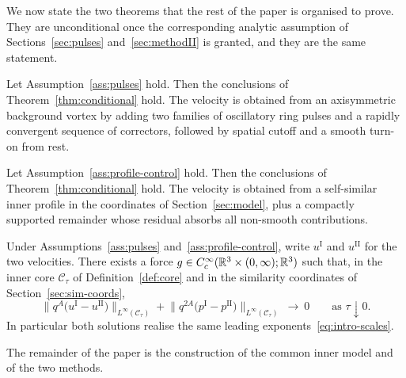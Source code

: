 We now state the two theorems that the rest of the paper is organised to prove. They are unconditional once the corresponding analytic assumption of Sections~\ref{sec:pulses} and~\ref{sec:methodII} is granted, and they are the same statement.

\begin{theorem}[Method~I]
\label{thm:methodI}
Let Assumption~\ref{ass:pulses} hold. Then the conclusions of Theorem~\ref{thm:conditional} hold. The velocity is obtained from an axisymmetric background vortex by adding two families of oscillatory ring pulses and a rapidly convergent sequence of correctors, followed by spatial cutoff and a smooth turn-on from rest.
\end{theorem}

\begin{theorem}[Method~II]
\label{thm:methodII}
Let Assumption~\ref{ass:profile-control} hold. Then the conclusions of Theorem~\ref{thm:conditional} hold. The velocity is obtained from a self-similar inner profile in the coordinates of Section~\ref{sec:model}, plus a compactly supported remainder whose residual absorbs all non-smooth contributions.
\end{theorem}

\begin{theorem}[Comparison]
\label{thm:comparison}
Under Assumptions~\ref{ass:pulses} and~\ref{ass:profile-control}, write $u^{\mathrm I}$ and $u^{\mathrm{II}}$ for the two velocities. There exists a force $g\in C_c^\infty(\mathbb{R}^3\times(0,\infty);\mathbb{R}^3)$ such that, in the inner core $\mathcal C_\tau$ of Definition~\ref{def:core} and in the similarity coordinates of Section~\ref{sec:sim-coords},
\begin{equation}
\label{eq:comparison}
\bigl\|q^{A}\bigl(u^{\mathrm I}-u^{\mathrm{II}}\bigr)\bigr\|_{L^\infty(\mathcal C_\tau)}
+\bigl\|q^{2A}\bigl(p^{\mathrm I}-p^{\mathrm{II}}\bigr)\bigr\|_{L^\infty(\mathcal C_\tau)}
\ \longrightarrow\ 0
\qquad\text{as }\tau\downarrow 0.
\end{equation}
In particular both solutions realise the same leading exponents~\eqref{eq:intro-scales}.
\end{theorem}

The remainder of the paper is the construction of the common inner model and of the two methods.

